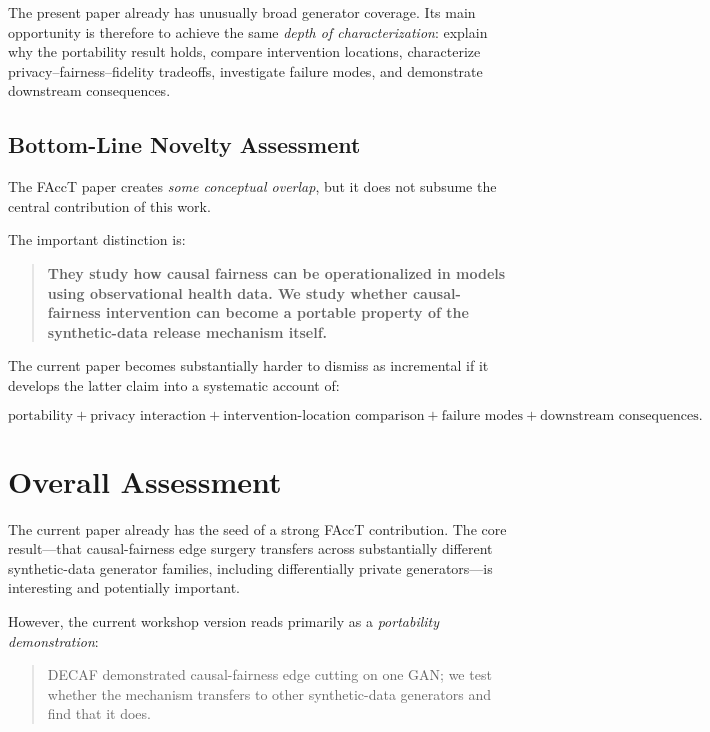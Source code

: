 \documentclass[11pt]{article}
\begin{document}
The present paper already has unusually broad generator coverage. Its main opportunity is therefore to achieve the same \emph{depth of characterization}: explain why the portability result holds, compare intervention locations, characterize privacy--fairness--fidelity tradeoffs, investigate failure modes, and demonstrate downstream consequences.

\subsection{Bottom-Line Novelty Assessment}

The FAccT paper creates \emph{some conceptual overlap}, but it does not subsume the central contribution of this work.

The important distinction is:

\begin{quote}
\textbf{They study how causal fairness can be operationalized in models using observational health data. We study whether causal-fairness intervention can become a portable property of the synthetic-data release mechanism itself.}
\end{quote}

The current paper becomes substantially harder to dismiss as incremental if it develops the latter claim into a systematic account of:

\[
\boxed{
\text{portability}
+
\text{privacy interaction}
+
\text{intervention-location comparison}
+
\text{failure modes}
+
\text{downstream consequences}.
}
\]


\section*{Overall Assessment}

The current paper already has the seed of a strong FAccT contribution. The core result---that causal-fairness edge surgery transfers across substantially different synthetic-data generator families, including differentially private generators---is interesting and potentially important.

However, the current workshop version reads primarily as a \emph{portability demonstration}:

\begin{quote}
DECAF demonstrated causal-fairness edge cutting on one GAN; we test whether the mechanism transfers to other synthetic-data generators and find that it does.
\end{quote}
\end{document}
